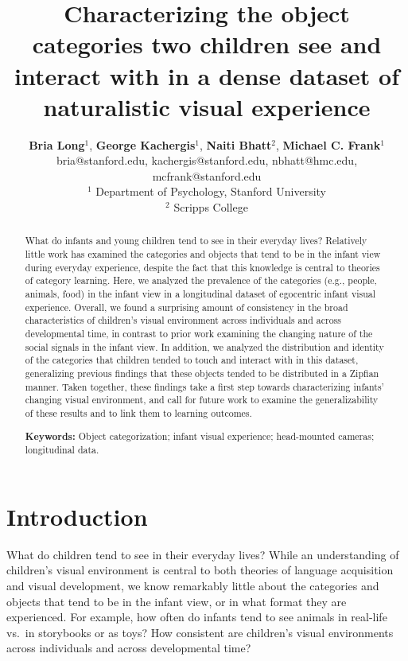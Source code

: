 \documentclass[10pt, letterpaper]{article}
\title{Characterizing the object categories two children see and interact with
in a dense dataset of naturalistic visual experience}
\author{{\bf Bria Long}$^{1}$, {\bf George Kachergis}$^{1}$, {\bf Naiti Bhatt}$^{2}$, {\bf Michael C. Frank}$^{1}$ \\ 
     bria@stanford.edu, kachergis@stanford.edu, nbhatt@hmc.edu, mcfrank@stanford.edu \\
     $^{1}$ Department of Psychology, Stanford University \\
     $^{2}$ Scripps College
     }
\begin{document}
\maketitle

\begin{abstract}
What do infants and young children tend to see in their everyday lives?
Relatively little work has examined the categories and objects that tend
to be in the infant view during everyday experience, despite the fact
that this knowledge is central to theories of category learning. Here,
we analyzed the prevalence of the categories (e.g., people, animals,
food) in the infant view in a longitudinal dataset of egocentric infant
visual experience. Overall, we found a surprising amount of consistency
in the broad characteristics of children's visual environment across
individuals and across developmental time, in contrast to prior work
examining the changing nature of the social signals in the infant view.
In addition, we analyzed the distribution and identity of the categories
that children tended to touch and interact with in this dataset,
generalizing previous findings that these objects tended to be
distributed in a Zipfian manner. Taken together, these findings take a
first step towards characterizing infants' changing visual environment,
and call for future work to examine the generalizability of these
results and to link them to learning outcomes.

\textbf{Keywords:}
Object categorization; infant visual experience; head-mounted cameras;
longitudinal data.
\end{abstract}

\hypertarget{introduction}{%
\section{Introduction}\label{introduction}}

What do children tend to see in their everyday lives? While an
understanding of children's visual environment is central to both
theories of language acquisition and visual development, we know
remarkably little about the categories and objects that tend to be in
the infant view, or in what format they are experienced. For example,
how often do infants tend to see animals in real-life vs.~in storybooks
or as toys? How consistent are children's visual environments across
individuals and across developmental time?
\end{document}
